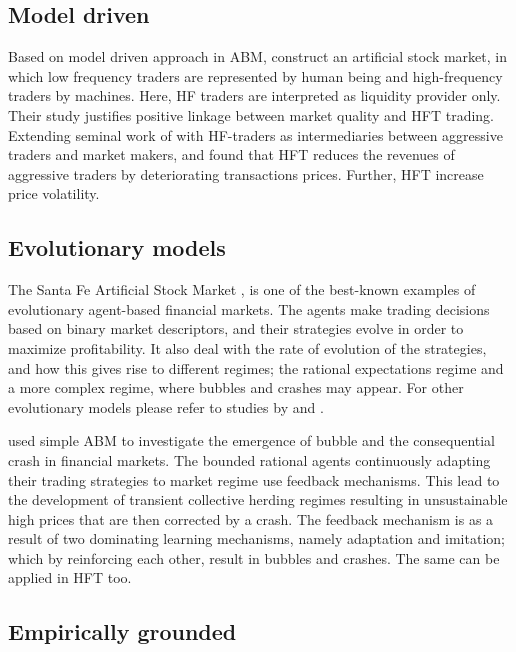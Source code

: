 \documentclass[12pt,a4paper]{article}
\numberwithin{equation}{section}
\numberwithin{figure}{section}
\numberwithin{table}{section}
\begin{document}
\subsection{Model driven}

Based on model driven approach in ABM, \citet{cvitanic2010} construct an artificial stock market, in which low frequency traders are represented by human being and high-frequency traders by machines. Here, HF traders are interpreted as liquidity provider only. Their study justifies positive linkage between market quality and HFT trading. Extending seminal work of \citet{grossman1988} with HF-traders as intermediaries between aggressive traders and market makers, \citet{cartea2011} and \citet{jarrow2012} found that HFT reduces the revenues of aggressive traders by deteriorating transactions prices. Further, HFT increase price volatility. 

\subsection{Evolutionary models}

The Santa Fe Artiﬁcial Stock Market \citep{PalmerArthurHollandLeBaronTayler1994}, is one of the best-known
examples of evolutionary agent-based ﬁnancial markets. The agents make trading decisions based on binary market descriptors, and their strategies evolve in order to maximize profitability. It also deal with the rate of evolution
of the strategies, and how this gives rise to different regimes; the rational expectations regime and a more complex regime, where bubbles and crashes may appear. For other evolutionary models please refer to studies by \citet{chen2001} and \citet{Pereira2009}.

\citet{harras2011} used simple ABM to investigate the emergence of bubble and the consequential crash in financial markets. The bounded rational agents continuously adapting their trading strategies to market regime use feedback mechanisms. This lead to the development of transient collective herding regimes resulting in unsustainable high prices that are then corrected by a crash. The feedback mechanism is as a result of two dominating learning mechanisms, namely adaptation and imitation; which by reinforcing each other, result in bubbles and crashes. The same can be applied in HFT too. 


\subsection{Empirically grounded}
\end{document}
